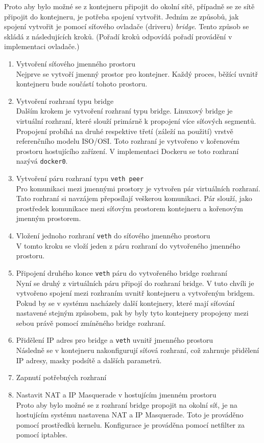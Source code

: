 Proto aby bylo možné se z kontejneru připojit do okolní sítě, případně se ze sítě připojit do kontejneru, je potřeba spojení vytvořit. Jedním ze způsobů, jak spojení vytvořit je pomocí síťového ovladače (driveru) \textit{bridge}. Tento způsob se skládá z následujících kroků. (Pořadí kroků odpovídá pořadí provádění v implementaci ovladače.)
\begin{enumerate}
\item Vytvoření síťového jmenného prostoru\\
Nejprve se vytvoří jmenný prostor pro kontejner. Každý proces, běžící uvnitř kontejneru bude součástí tohoto prostoru.%
\item Vytvoření rozhraní typu bridge\\
Dalším krokem je vytvoření rozhraní typu bridge. Linuxový bridge je virtuální rozhraní, které slouží primárně k propojení více síťových segmentů. Propojení probíhá na druhé respektive třetí (záleží na použití) vrstvě referenčního modelu ISO/OSI. Toto rozhraní je vytvořeno v kořenovém prostoru hostujícího zařízení. V implementaci Dockeru se toto rozhraní nazývá \verb|docker0|.
\item Vytvoření páru rozhraní typu \verb|veth peer|\\
Pro komunikaci mezi jmennými prostory je vytvořen pár virtuálních rozhraní. Tato rozhraní si navzájem přeposílají veškerou komunikaci. Pár slouží, jako prostředek komunikace mezi síťovým prostorem kontejneru a kořenovým jmenným prostorem.
\item Vložení jednoho rozhraní \verb|veth| do síťového jmenného prostoru\\
V tomto kroku se vloží jeden z páru rozhraní do vytvořeného jmenného prostoru. 
\item Připojení druhého konce \verb|veth| páru do vytvořeného bridge rozhraní\\
Nyní se druhý z virtuálních páru připojí do rozhraní bridge. V tuto chvíli je vytvořeno spojení mezi rozhraním uvnitř kontejneru a vytvořeným bridgem. Pokud by se v systému nacházely další kontejnery, které mají síťování nastavené stejným způsobem, pak by byly tyto kontejnery propojeny mezi sebou právě pomocí zmíněného bridge rozhraní.
\item Přidělení IP adres pro bridge a \verb|veth| uvnitř jmenného prostoru\\
Následně se v kontejneru nakonfigurují síťová rozhraní, což zahrnuje přidělení IP adresy, masky podsítě a dalších parametrů.  
\item Zapnutí potřebných rozhraní
\item Nastavit NAT a IP Masquerade v hostujícím jmenném prostoru\\
Proto aby bylo možné se z rozhraní bridge propojit na okolní síť, je na hostujícím systému nastavena NAT a IP Masquerade. Toto je prováděno pomocí prostředků kernelu. Konfigurace je prováděna pomocí netfilter za pomocí iptables.
\end{enumerate}

